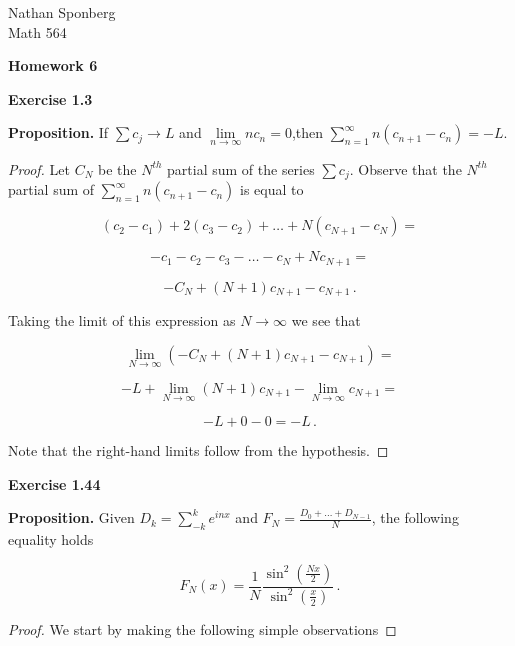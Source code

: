 \documentclass[a4paper]{article}
\numberwithin{equation}{section}
\begin{document}
\begin{flushright}
{\small{Nathan Sponberg\\}}
{\small{Math 564}}
\end{flushright}

\begin{center}
\bf{Homework 6}
\end{center}

\begin{description}

\item \textbf{Exercise 1.3}

\item \textbf{Proposition.} If $\sum c_j \rightarrow L$ and $\lim \limits_{n \rightarrow \infty} nc_n = 0$,then $\sum_{n=1}^\infty n(c_{n+1} - c_n) = -L$.

\begin{proof} Let $C_N$ be the $N^{th}$ partial sum of the series $\sum c_j$. Observe that the $N^{th}$ partial sum of $\sum_{n=1}^\infty n(c_{n+1} - c_n)$ is equal to

$$(c_2 - c_1) + 2(c_3 - c_2) + \dots + N(c_{N+1} - c_N) =$$

$$ -c_1-c_2-c_3-\dots - c_N + Nc_{N+1} = $$

$$-C_N + (N+1)c_{N+1} - c_{N+1}\,.$$

Taking the limit of this expression as $N \rightarrow \infty$ we see that

$$ \lim \limits_{N \rightarrow \infty} (-C_N + (N+1)c_{N+1} - c_{N+1}) = $$

$$ -L + \lim \limits_{N \rightarrow \infty}(N+1)c_{N+1} - \lim \limits_{N \rightarrow \infty}c_{N+1} = $$

$$-L + 0 - 0 = -L\,.$$

Note that the right-hand limits follow from the hypothesis.

\end{proof}

\item \textbf{Exercise 1.44} 

\item \textbf{Proposition.} Given $D_k = \sum_{-k}^{k} e^{inx}$ and $F_N = \frac{D_0 + \dots + D_{N-1}}{N}$, the following equality holds

$$F_N(x) = \frac{1}{N}\frac{\sin^2(\frac{Nx}{2})}{\sin^2(\frac{x}{2})}\,.$$

\begin{proof} We start by making the following simple observations


\end{proof}
\end{description}
\end{document}
